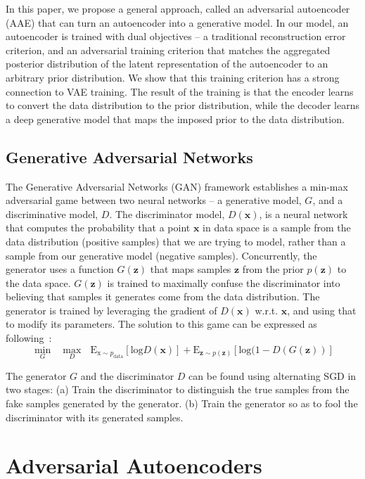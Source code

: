 \documentclass{article}
\begin{document}
In this paper, we propose a general approach, called an adversarial autoencoder (AAE) that can turn an autoencoder into a generative model.
In our model, an autoencoder is trained with dual objectives -- a traditional reconstruction error criterion, and an adversarial training
criterion \citep{gan} that matches the aggregated posterior distribution of the latent representation of the autoencoder to an arbitrary prior distribution.
We show that this training criterion has a strong connection to VAE training.  The result of the training is that the encoder learns to
convert the data distribution to the prior distribution, while the decoder learns a deep generative model that maps the imposed prior to the data distribution.


\subsection{Generative Adversarial Networks}
The Generative Adversarial Networks (GAN) \citep{gan} framework establishes a min-max adversarial game between two neural networks -- a generative model, $G$,
and a discriminative model, $D$.  The discriminator model, $D(\mathbf{x})$, is a neural network that computes the probability that a point $\mathbf{x}$ in
data space is a sample from the data distribution (positive samples) that we are trying to model, rather than a sample from our generative model (negative samples).
Concurrently, the generator uses a function $G(\mathbf{z})$ that maps samples $\mathbf{z}$ from the prior $p(\mathbf{z})$ to the data space. $G(\mathbf{z})$ is
trained to maximally confuse the discriminator into believing that samples it generates come from the data distribution. The generator is trained by leveraging
the gradient of $D(\mathbf{x})$ w.r.t. $\mathbf{x}$, and using that to modify its parameters.
The solution to this game can be expressed as following~\citep{gan}:
$$\underset{G}{\min}   \text{ } \underset{D}{\max} \text{ } \text{E}_{\text{x} \sim p_{\text{data}}} [\text{log} D(\mathbf{x})] + \text{E}_{\mathbf{z} \sim p(\mathbf{z})} [\text{log} (1 - D(G(\mathbf{\mathbf{z}}))]$$

The generator $G$ and the discriminator $D$ can be found using alternating SGD in two stages: (a) Train the discriminator to distinguish the true samples from the fake samples generated by the generator.
(b) Train the generator so as to fool the discriminator with its generated samples.


\section{Adversarial Autoencoders}
\end{document}
